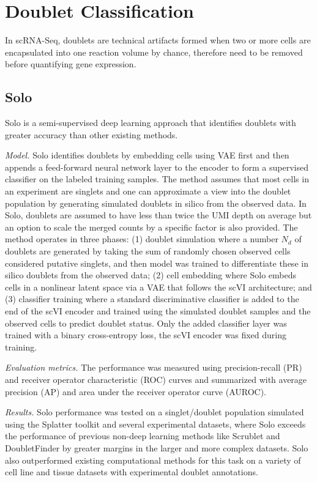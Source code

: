 \documentclass[
]{book}
\begin{document}
\hypertarget{ch-5-5}{%
\section{Doublet Classification}\label{ch-5-5}}

In scRNA-Seq, doublets are technical artifacts formed when two or more cells are encapsulated into one reaction volume by chance, therefore need to be removed before quantifying gene expression.

\hypertarget{ch-5-5-1}{%
\subsection{Solo}\label{ch-5-5-1}}

Solo \citep{RN154} is a semi-supervised deep learning approach that identifies doublets with greater accuracy than other existing methods.

\emph{Model.} Solo identifies doublets by embedding cells using VAE first and then appends a feed-forward neural network layer to the encoder to form a supervised classifier on the labeled training samples. The method assumes that most cells in an experiment are singlets and one can approximate a view into the doublet population by generating simulated doublets in silico from the observed data. In Solo, doublets are assumed to have less than twice the UMI depth on average but an option to scale the merged counts by a specific factor is also provided. The method operates in three phases: (1) doublet simulation where a number \(N_{d}\) of doublets are generated by taking the sum of randomly chosen observed cells considered putative singlets, and then model was trained to differentiate these in silico doublets from the observed data; (2) cell embedding where Solo embeds cells in a nonlinear latent space via a VAE that follows the scVI architecture; and (3) classifier training where a standard discriminative classifier is added to the end of the scVI encoder and trained using the simulated doublet samples and the observed cells to predict doublet status. Only the added classifier layer was trained with a binary cross-entropy loss, the scVI encoder was fixed during training.

\emph{Evaluation metrics.} The performance was measured using precision-recall (PR) and receiver operator characteristic (ROC) curves and summarized with average precision (AP) and area under the receiver operator curve (AUROC).

\emph{Results.} Solo performance was tested on a singlet/doublet population simulated using the Splatter toolkit \citep{RN190} and several experimental datasets, where Solo exceeds the performance of previous non-deep learning methods like Scrublet \citep{RN191} and DoubletFinder \citep{RN192} by greater margins in the larger and more complex datasets. Solo also outperformed existing computational methods for this task on a variety of cell line and tissue datasets with experimental doublet annotations.
\end{document}
